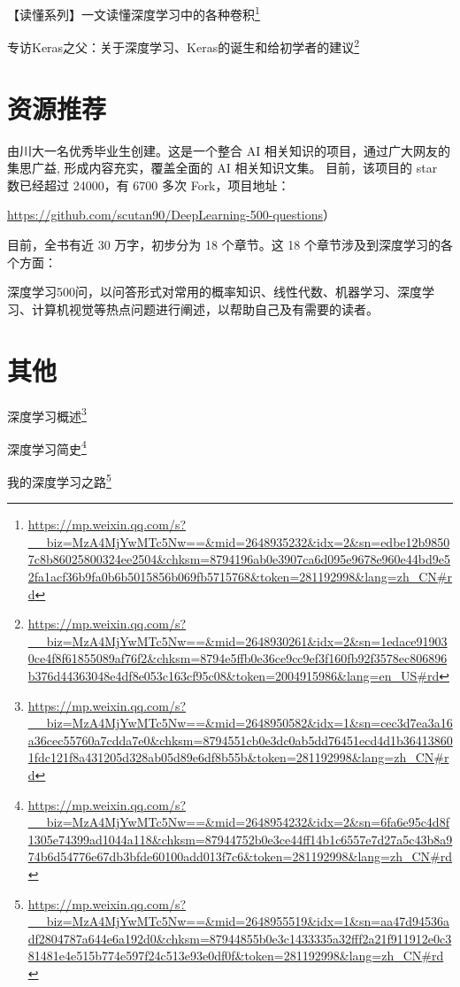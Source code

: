 \documentclass[]{ctexbook}
\renewcommand{\href}[2]{#2\footnote{\url{#1}}}
\begin{document}
\href{https://mp.weixin.qq.com/s?__biz=MzA4MjYwMTc5Nw==\&mid=2648935232\&idx=2\&sn=edbe12b98507c8b86025800324ee2504\&chksm=8794196ab0e3907ca6d095e9678e960e44bd9e52fa1acf36b9fa0b6b5015856b069fb5715768\&token=281192998\&lang=zh_CN\#rd}{【读懂系列】一文读懂深度学习中的各种卷积}

\href{https://mp.weixin.qq.com/s?__biz=MzA4MjYwMTc5Nw==\&mid=2648930261\&idx=2\&sn=1edace919030ce4f8f61855089af76f2\&chksm=8794e5ffb0e36ce9cc9ef3f160fb92f3578ec806896b376d44363048e4df8e053c163cf95c08\&token=2004915986\&lang=en_US\#rd}{专访Keras之父：关于深度学习、Keras的诞生和给初学者的建议}

\hypertarget{ux8d44ux6e90ux63a8ux8350}{%
\section{资源推荐}\label{ux8d44ux6e90ux63a8ux8350}}

由川大一名优秀毕业生创建。这是一个整合 AI 相关知识的项目，通过广大网友的集思广益, 形成内容充实，覆盖全面的 AI 相关知识文集。
目前，该项目的 star 数已经超过 24000，有 6700 多次 Fork，项目地址：

\url{https://github.com/scutan90/DeepLearning-500-questions}）

目前，全书有近 30 万字，初步分为 18 个章节。这 18 个章节涉及到深度学习的各个方面：

深度学习500问，以问答形式对常用的概率知识、线性代数、机器学习、深度学习、计算机视觉等热点问题进行阐述，以帮助自己及有需要的读者。

\hypertarget{ux5176ux4ed6-3}{%
\section{其他}\label{ux5176ux4ed6-3}}

\href{https://mp.weixin.qq.com/s?__biz=MzA4MjYwMTc5Nw==\&mid=2648950582\&idx=1\&sn=cec3d7ea3a16a36cec55760a7cdda7e0\&chksm=8794551cb0e3dc0ab5dd76451ecd4d1b364138601fdc121f8a431205d328ab05d89e6df8b55b\&token=281192998\&lang=zh_CN\#rd}{深度学习概述}

\href{https://mp.weixin.qq.com/s?__biz=MzA4MjYwMTc5Nw==\&mid=2648954232\&idx=2\&sn=6fa6e95c4d8f1305e74399ad1044a118\&chksm=87944752b0e3ce44ff14b1c6557e7d27a5c43b8a974b6d54776e67db3bfde60100add013f7c6\&token=281192998\&lang=zh_CN\#rd}{深度学习简史}

\href{https://mp.weixin.qq.com/s?__biz=MzA4MjYwMTc5Nw==\&mid=2648955519\&idx=1\&sn=aa47d94536adf2804787a644e6a192d0\&chksm=87944855b0e3c1433335a32fff2a21f911912e0c381481e4e515b774e597f24c513e93e0df0f\&token=281192998\&lang=zh_CN\#rd}{我的深度学习之路}
\end{document}
